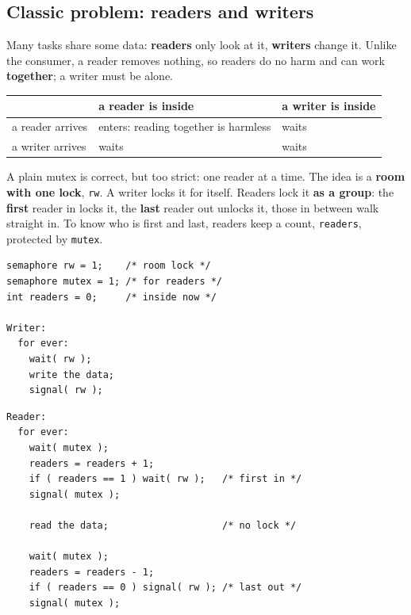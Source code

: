 \subsection{Classic problem: readers and writers}
Many tasks share some data: \textbf{readers} only look at it, \textbf{writers} change it. Unlike the consumer, a reader removes nothing, so readers do no harm and can work \textbf{together}; a writer must be alone.
\begin{center}
\small
\begin{tabular}{l P{0.35} P{0.25}}
    \hline
    & \textbf{a reader is inside} & \textbf{a writer is inside} \\
    \hline
    a reader arrives & enters: reading together is harmless & waits \\
    a writer arrives & waits & waits \\
    \hline
\end{tabular}
\end{center}
A plain mutex is correct, but too strict: one reader at a time. The idea is a \textbf{room with one lock}, \texttt{rw}. A writer locks it for itself. Readers lock it \textbf{as a group}: the \textbf{first} reader in locks it, the \textbf{last} reader out unlocks it, those in between walk straight in. To know who is first and last, readers keep a count, \texttt{readers}, protected by \texttt{mutex}.
\par\noindent\begin{minipage}[t]{0.4\textwidth}
\begin{lstlisting}[basicstyle=\ttfamily\scriptsize]
semaphore rw = 1;    /* room lock */
semaphore mutex = 1; /* for readers */
int readers = 0;     /* inside now */

Writer:
  for ever:
    wait( rw );
    write the data;
    signal( rw );
\end{lstlisting}
\end{minipage}\hfill
\begin{minipage}[t]{0.58\textwidth}
\begin{lstlisting}[basicstyle=\ttfamily\scriptsize]
Reader:
  for ever:
    wait( mutex );
    readers = readers + 1;
    if ( readers == 1 ) wait( rw );   /* first in */
    signal( mutex );

    read the data;                    /* no lock */

    wait( mutex );
    readers = readers - 1;
    if ( readers == 0 ) signal( rw ); /* last out */
    signal( mutex );
\end{lstlisting}
\end{minipage}
